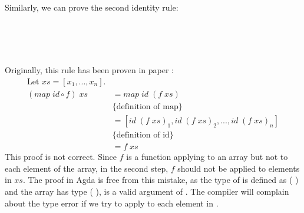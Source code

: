 \documentclass{l4proj}
\begin{document}
Similarly, we can prove the second identity rule:
\begin{code}%
\>[0]\<%
\\
\>[0]\AgdaSpace{}%
\AgdaSymbol{:}%
\>[146I]\AgdaSymbol{\{}\AgdaSpace{}%
\AgdaSymbol{:}\AgdaSpace{}%
\AgdaSymbol{\}}\AgdaSpace{}%
\AgdaSpace{}%
\AgdaSymbol{\{}\AgdaSpace{}%
\AgdaSpace{}%
\AgdaSymbol{:}\AgdaSpace{}%
\AgdaSymbol{\}}\AgdaSpace{}%
\AgdaSpace{}%
\AgdaSymbol{(}\AgdaSpace{}%
\AgdaSymbol{:}\AgdaSpace{}%
\AgdaSpace{}%
\AgdaSpace{}%
\AgdaSpace{}%
\AgdaSpace{}%
\AgdaSpace{}%
\AgdaSpace{}%
\AgdaSymbol{)}\AgdaSpace{}%
\AgdaSpace{}%
\AgdaSymbol{(}\AgdaSpace{}%
\AgdaSymbol{:}\AgdaSpace{}%
\AgdaSpace{}%
\AgdaSpace{}%
\AgdaSymbol{)}\AgdaSpace{}%
\<%
\\
\>[.][@{}l@{}]\<[146I]%
\>[12]\AgdaSymbol{(}\AgdaSpace{}%
\AgdaSpace{}%
\AgdaSpace{}%
\AgdaSymbol{)}\AgdaSpace{}%
\AgdaSpace{}%
\AgdaSpace{}%
\AgdaSpace{}%
\<%
\\
\>[0]\AgdaSpace{}%
\AgdaSpace{}%
\AgdaSpace{}%
\AgdaSymbol{=}\AgdaSpace{}%
\AgdaSpace{}%
\AgdaSymbol{(}\AgdaSpace{}%
\AgdaSymbol{)}\<%
\end{code}
Originally, this rule has been proven in paper \citep{steuwer2015improving}:
\begin{align*}
    \mbox{Let $xs = [x_1, ... , x_n]$.}\\
    (map\; id \circ f)\; xs &= map\; id\; (f\; xs)\\
                        &\mbox{\{definition of map\}}\\
                        &= [id\; (f\; xs)_1, id\; (f\; xs)_2, ... , id\; (f\; xs)_n]\\
                        &\mbox{\{definition of id\}}\\
                        &= f\; xs
\end{align*}
This proof is not correct. Since $f$ is a function applying to an array but not to each element of the array, in the second step, $f$ should not be applied to elements in $xs$. The proof in Agda is free from this mistake, as the type of  is defined as (\AgdaSpace{}%
\AgdaSpace{}%
\AgdaSpace{}%
\AgdaSpace{}%
\AgdaSpace{}%
\AgdaSpace{}%
) and the array  has type 
(\AgdaSpace{}%
\AgdaSpace{}%
),  is a valid argument of . The compiler will complain about the type error if we try to apply  to each element in .
\end{document}
